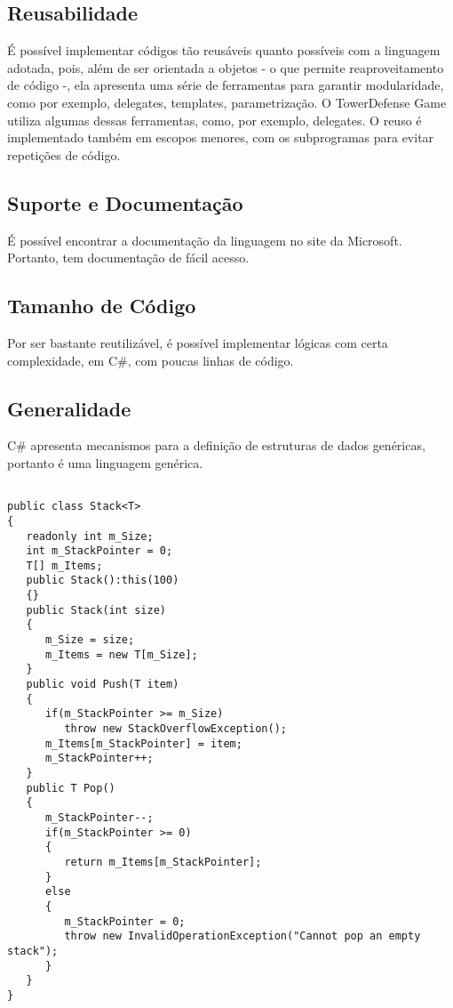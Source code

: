 \documentclass[rel_mlp]{iiufrgs}
\begin{document}
\subsection{Reusabilidade}

É possível implementar códigos tão reusáveis quanto possíveis com a linguagem adotada, pois, além de ser orientada a objetos - o que permite reaproveitamento de código -, ela apresenta uma série de ferramentas para garantir modularidade, como por exemplo, delegates, templates, parametrização. O TowerDefense Game utiliza algumas dessas ferramentas, como, por exemplo, delegates. O reuso é implementado também em escopos menores, com os subprogramas para evitar repetições de código.  

\subsection{Suporte e Documentação}

É possível encontrar a documentação da linguagem no site da Microsoft. Portanto, tem documentação de fácil acesso.

\subsection{Tamanho de Código}

Por ser bastante reutilizável, é possível implementar lógicas com certa complexidade, em C\#, com poucas linhas de código. 

\subsection{Generalidade}

C\# apresenta mecanismos para a definição de estruturas de dados genéricas, portanto é uma linguagem genérica.

\begin{lstlisting}[caption=Trecho de código C\# retirado de documentação online da linguagem, label=lst:test]

public class Stack<T>
{
   readonly int m_Size; 
   int m_StackPointer = 0;
   T[] m_Items;
   public Stack():this(100)
   {}
   public Stack(int size)
   {
      m_Size = size;
      m_Items = new T[m_Size];
   }
   public void Push(T item)
   {
      if(m_StackPointer >= m_Size) 
         throw new StackOverflowException();
      m_Items[m_StackPointer] = item;
      m_StackPointer++;
   }
   public T Pop()
   {
      m_StackPointer--;
      if(m_StackPointer >= 0)
      {
         return m_Items[m_StackPointer];
      }
      else
      {
         m_StackPointer = 0;
         throw new InvalidOperationException("Cannot pop an empty stack");
      }
   }
}

\end{lstlisting}
\end{document}

